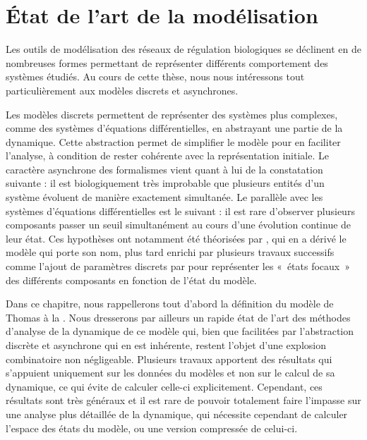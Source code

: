 
\chapter{État de l'art de la modélisation}


Les outils de modélisation des réseaux de régulation biologiques se déclinent en de nombreuses
formes permettant de représenter différents comportement des systèmes étudiés.
Au cours de cette thèse, nous nous intéressons tout particulièrement aux modèles discrets
et asynchrones.

Les modèles discrets permettent de représenter des systèmes plus complexes,
comme des systèmes d'équations différentielles,
en abstrayant une partie de la dynamique.
Cette abstraction permet de simplifier le modèle pour en faciliter l'analyse,
à condition de rester cohérente avec la représentation initiale.
Le caractère asynchrone des formalismes vient quant à lui de la constatation suivante :
il est biologiquement très improbable que plusieurs entités d'un système
évoluent de manière exactement simultanée.
Le parallèle avec les systèmes d'équations différentielles est le suivant :
il est rare d'observer plusieurs composants passer un seuil simultanément
au cours d'une évolution continue de leur état.
Ces hypothèses ont notamment été théorisées par ,
qui en a dérivé le modèle qui porte son nom,
plus tard enrichi par plusieurs travaux successifs
comme l'ajout de paramètres discrets par 
pour représenter les «~états focaux~» des différents
composants en fonction de l'état du modèle.

Dans ce chapitre, nous rappellerons tout d'abord la définition du modèle de Thomas
à la .
Nous dresserons par ailleurs un rapide état de l'art des méthodes d'analyse
de la dynamique de ce modèle qui, bien que facilitées par
l'abstraction discrète et asynchrone qui en est inhérente,
restent l'objet d'une explosion combinatoire non négligeable.
Plusieurs travaux apportent des résultats qui s'appuient uniquement sur les données
du modèles et non sur le calcul de sa dynamique,
ce qui évite de calculer celle-ci explicitement.
Cependant, ces résultats sont très généraux et il est rare de pouvoir totalement faire l'impasse
sur une analyse plus détaillée de la dynamique,
qui nécessite cependant de calculer l'espace des états du modèle,
ou une version compressée de celui-ci.

